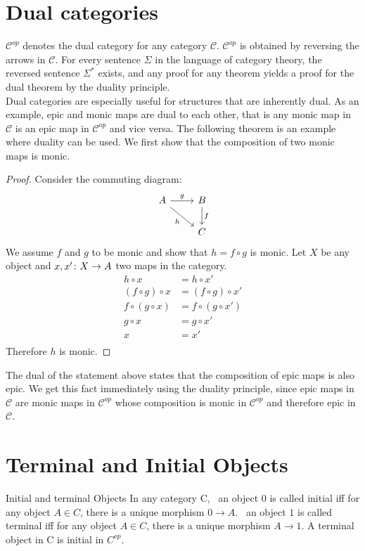 \section {Dual categories}

$\mathscr{C}^{op}$ denotes the dual category for any category $\mathscr{C}$.
$\mathscr{C}^{op}$ is obtained by reversing the arrows in $\mathscr{C}$.
For every sentence $\Sigma$ in the language of category theory,
the reversed sentence $\Sigma^*$ exists,
and any proof for any theorem yields a proof for the dual theorem by the duality principle.\\
Dual categories are especially useful for structures that are inherently dual.
As an example, epic and monic maps are dual to each other, that is any monic map in $\mathscr{C}$
is an epic map in $\mathscr{C}^{op}$ and vice versa.
The following theorem is an example where duality can be used.
We first show that the composition of two monic maps is monic.
\begin{proof}
  Consider the commuting diagram:
  \[
    \begin{tikzcd}
      A \arrow[dr, swap, "h"] \arrow{r}{g} & B \arrow{d}{f} \\
      & C
    \end{tikzcd}
  \]
  We assume $f$ and $g$ to be monic and show that $h = f \circ g $ is monic.
  Let $X$ be any object and $x, x' \from X \to A$ two maps in the category.
  \begin{align*}
    h \circ x &= h \circ x' \\
    (f \circ g) \circ x &= (f \circ g) \circ x' \\
    f \circ (g \circ x) &= f \circ (g \circ x') \\
    g \circ x &= g \circ x' \\
    x &= x' \\
  \end{align*}
  Therefore $h$ is monic.
\end{proof}
The dual of the statement above states that the composition of epic maps is also epic.
We get this fact immediately using the duality principle, since epic maps in $\mathscr{C}$
are monic maps in $\mathscr{C}^{op}$ whose composition is monic in $\mathscr{C}^{op}$ and
therefore epic in $\mathscr{C}$.

\section {Terminal and Initial Objects}
\begin {definition}{Initial and terminal Objects}
  In any category C, \ an object $0$ is called initial
  iff for any object $A \in C$, there is a unique morphism $0 \to A$. \ an object $1$
  is called terminal iff for any object $A \in C$,
  there is a unique morphism $A \to 1$. A terminal object in C is initial in $C^{op}$.
\end {definition}

